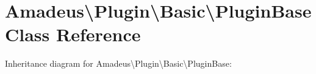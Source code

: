 \hypertarget{classAmadeus_1_1Plugin_1_1Basic_1_1PluginBase}{}\section{Amadeus\textbackslash{}Plugin\textbackslash{}Basic\textbackslash{}Plugin\+Base Class Reference}
\label{classAmadeus_1_1Plugin_1_1Basic_1_1PluginBase}


Inheritance diagram for Amadeus\textbackslash{}Plugin\textbackslash{}Basic\textbackslash{}Plugin\+Base\+:
